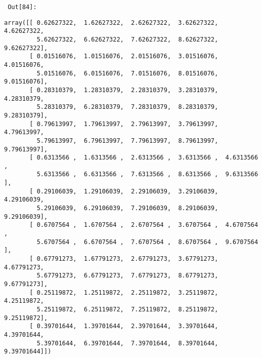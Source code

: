         {\par%
        \vspace{-1\smallerfontscale}%
        \noindent%
        \begin{minipage}{\cellleftmargin}%
    \hfill%
    {\smaller%
    \tt%
    \color{nbframe-out-prompt}%
    Out[84]:}%
    \hspace{\inputpadding}%
    \hspace{0em}%
    \hspace{3pt}%
    \end{minipage}%
        }%
    \begin{addmargin}[\cellleftmargin]{0em}%
    {\smaller%
    \vspace{-1\smallerfontscale}%
    
    
    
    \begin{verbatim}
array([[ 0.62627322,  1.62627322,  2.62627322,  3.62627322,  4.62627322,
         5.62627322,  6.62627322,  7.62627322,  8.62627322,  9.62627322],
       [ 0.01516076,  1.01516076,  2.01516076,  3.01516076,  4.01516076,
         5.01516076,  6.01516076,  7.01516076,  8.01516076,  9.01516076],
       [ 0.28310379,  1.28310379,  2.28310379,  3.28310379,  4.28310379,
         5.28310379,  6.28310379,  7.28310379,  8.28310379,  9.28310379],
       [ 0.79613997,  1.79613997,  2.79613997,  3.79613997,  4.79613997,
         5.79613997,  6.79613997,  7.79613997,  8.79613997,  9.79613997],
       [ 0.6313566 ,  1.6313566 ,  2.6313566 ,  3.6313566 ,  4.6313566 ,
         5.6313566 ,  6.6313566 ,  7.6313566 ,  8.6313566 ,  9.6313566 ],
       [ 0.29106039,  1.29106039,  2.29106039,  3.29106039,  4.29106039,
         5.29106039,  6.29106039,  7.29106039,  8.29106039,  9.29106039],
       [ 0.6707564 ,  1.6707564 ,  2.6707564 ,  3.6707564 ,  4.6707564 ,
         5.6707564 ,  6.6707564 ,  7.6707564 ,  8.6707564 ,  9.6707564 ],
       [ 0.67791273,  1.67791273,  2.67791273,  3.67791273,  4.67791273,
         5.67791273,  6.67791273,  7.67791273,  8.67791273,  9.67791273],
       [ 0.25119872,  1.25119872,  2.25119872,  3.25119872,  4.25119872,
         5.25119872,  6.25119872,  7.25119872,  8.25119872,  9.25119872],
       [ 0.39701644,  1.39701644,  2.39701644,  3.39701644,  4.39701644,
         5.39701644,  6.39701644,  7.39701644,  8.39701644,  9.39701644]])
    \end{verbatim}

    
}%
    \end{addmargin}%

